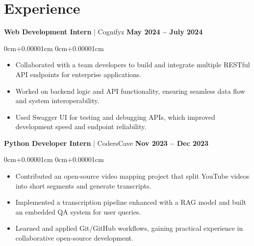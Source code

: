 \documentclass[10pt,a4paper]{article}
\newenvironment{highlights}{
    \begin{itemize}[
        topsep=0.10cm,
        parsep=0.10cm,
        partopsep=0pt,
        itemsep=0pt,
        leftmargin=10pt,
    ]
    }{
    \end{itemize}
}
\newenvironment{onecolentry}{
    \begin{adjustwidth}{
        0cm+0.00001cm
    }{
        0cm+0.00001cm
    }
    }{
    \end{adjustwidth}
}
\begin{document}
    \section{Experience}\label{sec:experience}

    \textbf{Web Development Intern} | Cognifyz \hfill \textbf{May 2024 – July 2024}
    \begin{onecolentry}
        \begin{highlights}
            \vspace{0.01cm}
            \item Collaborated with a team developers to build and integrate multiple RESTful API endpoints for enterprise applications.
            \item Worked on backend logic and API functionality, ensuring seamless data flow and system interoperability.
            \item Used Swagger UI for testing and debugging APIs, which improved development speed and endpoint reliability.
        \end{highlights}
    \end{onecolentry}
    \vspace{0.1cm}
    \textbf{Python Developer Intern} | CodersCave \hfill \textbf{Nov 2023 – Dec 2023}
    \begin{onecolentry}
        \begin{highlights}
            \vspace{0.01cm}
            \item Contributed an open-source video mapping project that split YouTube videos into short segments and generate transcripts.
            \item Implemented a transcription pipeline enhanced with a RAG model and built an embedded QA system for user queries.
            \item Learned and applied Git/GitHub workflows, gaining practical experience in collaborative open-source development.
        \end{highlights}
    \end{onecolentry}
\end{document}
